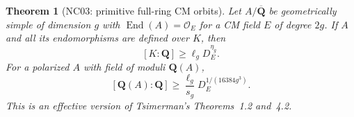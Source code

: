 \documentclass[11pt]{article}
\newtheorem{theorem}{Theorem}[section]
\theoremstyle{remark}
\begin{document}
\begin{theorem}[NC03: primitive full-ring CM orbits]
\label{NC03}
Let $A/\overline{\mathbf Q}$ be geometrically simple of dimension $g$
with $\operatorname{End}(A)=\mathcal O_E$ for a CM field $E$ of degree
$2g$.  If $A$ and all its endomorphisms are defined over $K$, then
\begin{equation}\label{eq:NC03-def}
 [K:\mathbf Q]\geq\ell_g D_E^{\eta_g}.
\end{equation}
For a polarized $A$ with field of moduli $\mathbf Q(A)$,
\begin{equation}\label{eq:NC03-moduli}
 [\mathbf Q(A):\mathbf Q]\geq
 \frac{\ell_g}{s_g}D_E^{1/(16384g^3)}.
\end{equation}
This is an effective version of Tsimerman's Theorems~1.2 and~4.2.
\end{theorem}
\end{document}
